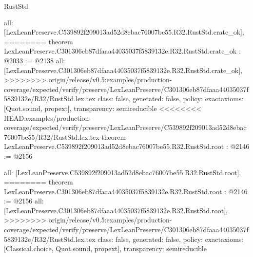 \begin{lexlean}{RustStd}
\begin{coremodule}
{\begin{coremodule}
{{{{{{  all: [LexLeanPreserve.C539892f209013ad52d8ebac76007be55.R32.RustStd.crate_ok],
========
theorem LexLeanPreserve.C301306eb87dfaaa44035037f5839132e.R32.RustStd.crate_ok : @2033 := @2138 {
  all: [LexLeanPreserve.C301306eb87dfaaa44035037f5839132e.R32.RustStd.crate_ok],
>>>>>>>> origin/release/v0.5:examples/production-coverage/expected/verify/preserve/LexLeanPreserve/C301306eb87dfaaa44035037f5839132e/R32/RustStd.lex.tex
  class: false,
  generated: false,
  policy: exact{axioms: [Quot.sound, propext]},
  transparency: semireducible
}
<<<<<<<< HEAD:examples/production-coverage/expected/verify/preserve/LexLeanPreserve/C539892f209013ad52d8ebac76007be55/R32/RustStd.lex.tex
theorem LexLeanPreserve.C539892f209013ad52d8ebac76007be55.R32.RustStd.root : @2146 := @2156 {
  all: [LexLeanPreserve.C539892f209013ad52d8ebac76007be55.R32.RustStd.root],
========
theorem LexLeanPreserve.C301306eb87dfaaa44035037f5839132e.R32.RustStd.root : @2146 := @2156 {
  all: [LexLeanPreserve.C301306eb87dfaaa44035037f5839132e.R32.RustStd.root],
>>>>>>>> origin/release/v0.5:examples/production-coverage/expected/verify/preserve/LexLeanPreserve/C301306eb87dfaaa44035037f5839132e/R32/RustStd.lex.tex
  class: false,
  generated: false,
  policy: exact{axioms: [Classical.choice, Quot.sound, propext]},
  transparency: semireducible
}

}}}}}}}
\end{coremodule}}
\end{coremodule}
\end{lexlean}
